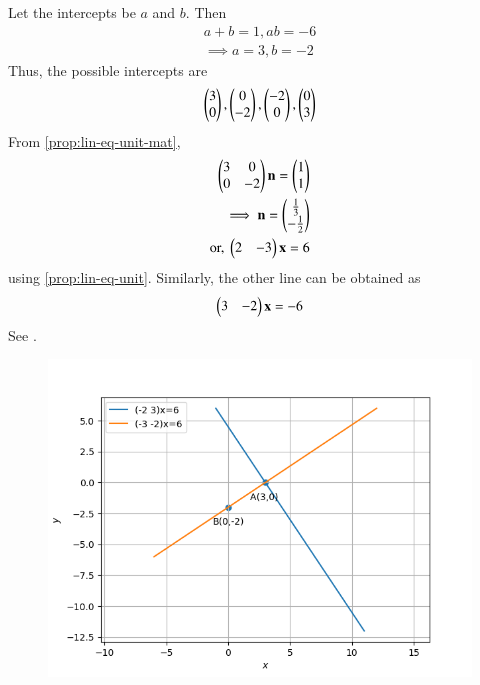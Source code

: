 Let the intercepts be $a$ and  $b$. Then
\begin{align}
a+b=1,
ab=-6 \label{eq:11/10/4/32a}
\\
\implies  a = 3, b = -2
\end{align}
Thus, the possible 
intercepts are
\begin{align}
\begin{pmatrix}3\\0\end{pmatrix}, \begin{pmatrix}0\\-2\end{pmatrix},
\begin{pmatrix}-2\\0\end{pmatrix}, \begin{pmatrix}0\\3\end{pmatrix}
\end{align}
From
		\eqref{prop:lin-eq-unit-mat},
\begin{align}
	\begin{pmatrix}3 & 0 \\ 0 &-2\end{pmatrix}\mathbf{n} = \begin{pmatrix}1 \\ 1\end{pmatrix}
	\\
	\implies \mathbf{n} = \begin{pmatrix}\frac{1}{3} \\ -\frac{1}{2}\end{pmatrix}
	\\
	\text{or, } \begin{pmatrix}2 & -3\end{pmatrix}\mathbf{x} = 6
\end{align}
using		\eqref{prop:lin-eq-unit}.
Similarly, the other line can be obtained
as
\begin{align}
	\begin{pmatrix} 3 & -2 \end{pmatrix}  \mathbf{x}  = -6        
\end{align}
See  
.
\begin{figure}[!htbp]
\centering
\includegraphics[width=\columnwidth]{chapters/11/10/4/3/figs/inter.png}
\caption{}
\label{fig:11/10/4/3line segmenta}
\end{figure}
